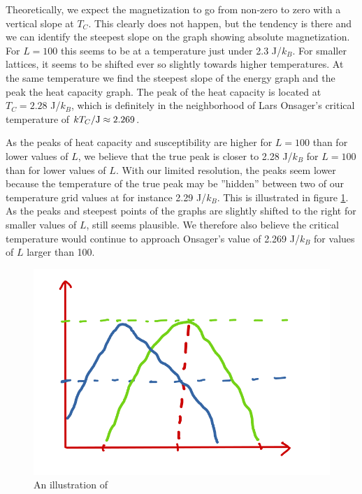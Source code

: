 \documentclass[reprint, english,notitlepage,nofootinbib]{revtex4-1}  %
\begin{document}
Theoretically, we expect the magnetization to go from non-zero to zero with a vertical slope at $T_C$. This clearly does not happen, but the tendency is there and we can identify the steepest slope on the graph showing absolute magnetization. For $L = 100$ this seems to be at a temperature just under 2.3 J/$k_B$. For smaller lattices, it seems to be shifted ever so slightly towards higher temperatures. At the same temperature we find the steepest slope of the energy graph and the peak the heat capacity graph. The peak of the heat capacity is located at $T_C = 2.28$ J/$k_B$, which is definitely in the neighborhood of Lars Onsager's critical temperature of $kT_C/\rm{J} \approx 2.269$.

As the peaks of heat capacity and susceptibility are higher for $L = 100$ than for lower values of $L$, we believe that the true peak is closer to 2.28 J/$k_B$ for $L = 100$ than for lower values of $L$. With our limited resolution, the peaks seem lower because the temperature of the true peak may be ''hidden'' between two of our temperature grid values at for instance 2.29 J/$k_B$. This is illustrated in figure \ref{fig:drawing_critical_temp}. As the peaks and steepest points of the graphs are slightly shifted to the right for smaller values of $L$, still seems plausible. We therefore also believe the critical temperature would continue to approach Onsager's value of 2.269 J/$k_B$ for values of $L$ larger than 100.
\begin{figure}
  \includegraphics[width=\linewidth]{../output/Drawing.png}
  \caption{An illustration of}
  \label{fig:drawing_critical_temp}
\end{figure}
\end{document}
